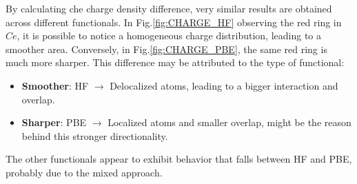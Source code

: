 \documentclass{article}
\begin{document}
By calculating che charge density difference, very similar results are obtained across different functionals. In Fig.\ref{fig:CHARGE_HF} observing the red ring in $Ce$, it is possible to notice a homogeneous charge distribution, leading to a smoother area. Conversely, in Fig.\ref{fig:CHARGE_PBE}, the same red ring is much more sharper. This difference may be attributed to the type of functional:
\begin{itemize}
	\item \textbf{Smoother}: HF $\rightarrow$ Delocalized atoms, leading to a bigger interaction and overlap.
	\item \textbf{Sharper}: PBE $\rightarrow$ Localized atoms and smaller overlap, might be the reason behind this stronger directionality. 
\end{itemize}
The other functionals appear to exhibit behavior that falls between HF and PBE, probably due to the mixed approach.

\vspace{15pt}
\end{document}
